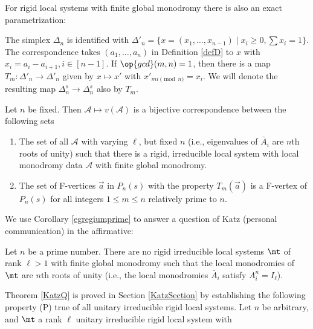 
For rigid local systems with finite global monodromy there is also an exact parametrization:
\begin{defi}
\notready\label{aliA}
The simplex  $\Delta_n$ is identified with $\Delta'_n= \{{x}=(x_1,\dots, x_{n-1})\mid x_i\geq 0, \sum x_i=1\}$. The correspondence takes $(a_1,\dots, a_n)$ in Definition \ref{defD} to ${x}$ with $x_i=a_i-a_{i+1}, i\in[n-1]$.  If $\op{gcd}(m,n)=1$, then there is a map $T_m:\Delta'_n \to\Delta'_n$ given by ${x}\mapsto {x}'$ with $x'_{mi \pmod{n}}=x_i$.   We will denote the resulting map $\Delta^s_n\to \Delta^s_n$ also by $T_m$.
\end{defi}
\begin{corollary}
\notready\label{egregiumprime}
Let $n$ be fixed. Then  $\mathcal{A}\mapsto v(\mathcal{A})$  is a bijective correspondence between the following sets
\begin{enumerate}
\item The set of all $\mathcal{A}$ with varying $\ell$, but fixed $n$ (i.e., eigenvalues of $\bar{A}_i$ are $n$th roots of unity) such that there is a rigid, irreducible  local system with local monodromy data $\mathcal{A}$ with finite global monodromy.
\item The set  of F-vertices $\vec{a}$ in $P_n(s)$ with the property $T_m(\vec{a})$ is a F-vertex of $P_n(s)$ for all integers $1\leq m\leq n$ relatively prime to $n$.
\end{enumerate}
\end{corollary}
We use Corollary \ref{egregiumprime} to answer a question of Katz (personal communication) in the affirmative:
\begin{theorem}
\notready\label{KatzQ}
Let $n$ be a prime number. There are no rigid irreducible  local systems $\mt$ of rank $\ell>1$ with finite global monodromy such that the local monodromies of $\mt$ are $n$th roots of unity (i.e., the local monodromies $\bar{A}_i$ satisfy $A_i^n=I_{\ell}$).
\end{theorem}
Theorem \ref{KatzQ} is proved  in Section \ref{KatzSection} by establishing the following property (P) true of all unitary irreducible rigid local systems. Let $n$ be arbitrary, and $\mt$ a rank $\ell$ unitary irreducible rigid local system with
